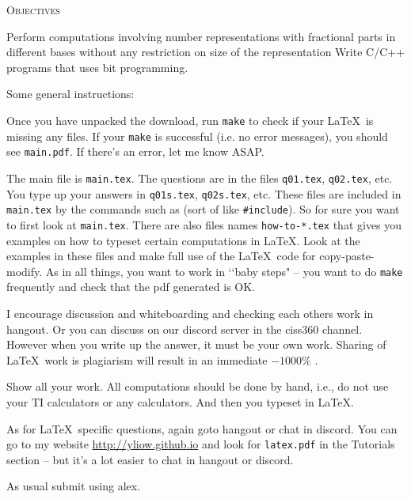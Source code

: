 \textsc{Objectives}
\begin{enumerate}
\li Perform computations involving number representations with fractional parts
in different bases without any restriction on size of the representation 
\li Write C/C++ programs that uses bit programming.
\end{enumerate}

Some general instructions:
\begin{enumerate}

  \li
  Once you have unpacked the download, run \verb!make! to check if your
  \LaTeX\ is missing any files. If your \verb!make! is successful (i.e. no
  error messages), you should see \verb!main.pdf!.
  If there's an error, let me know ASAP.
  
  \li
  The main file is \verb!main.tex!.
  The questions are in the files
  \verb!q01.tex!,
  \verb!q02.tex!, etc.
  You type up your answers in
  \verb!q01s.tex!,
  \verb!q02s.tex!, etc.
  These files are included in \verb!main.tex! by the commands
  such as
  \verb!! (sort of like \verb!#include!).
  So for sure you want to first look at \verb!main.tex!.
  There are also files names \verb!how-to-*.tex! that gives you examples
  on how to typeset certain computations in \LaTeX.
  Look at the examples in these files and make full use of the \LaTeX\ code
  for copy-paste-modify.
  As in all things, you want to work in \lq\lq baby steps" --
  you want to do \verb!make! frequently and check that the pdf generated is OK.


  \li
  I encourage discussion and whiteboarding and checking each others work
  in hangout.
  Or you can discuss on our discord server
  in the ciss360 channel.
  However when you write up the answer,
  it must be your own work.
  Sharing of \LaTeX\ work is plagiarism will result in an immediate $-1000\%$    .

  \li
  Show all your work. All computations should be done by hand, i.e.,
  do not use your TI calculators or any calculators.
  And then you typeset in \LaTeX.

  \li
  As for \LaTeX\ specific questions, again goto hangout or chat in discord.
  You can go to my website \url{http://yliow.github.io}
  and look for \verb!latex.pdf! in the Tutorials section --
  but it's a lot easier to chat in hangout or discord.
  
  \li
  As usual submit using alex.
  
\end{enumerate}
